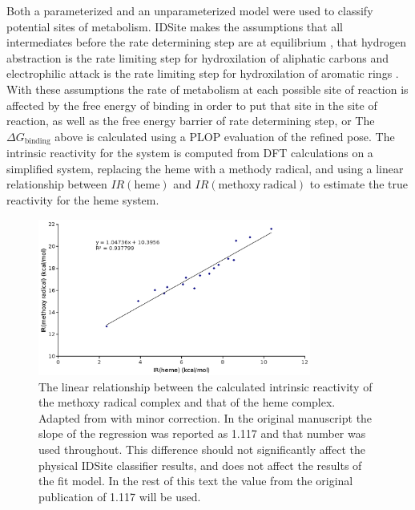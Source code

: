 Both a parameterized and an unparameterized model were used to classify potential sites of metabolism.
IDSite makes the assumptions that all intermediates before the rate determining step are at equilibrium \cite{wang2007stochastic}, that hydrogen abstraction is the rate limiting step for hydroxilation of aliphatic carbons and electrophilic attack is the rate limiting step for hydroxilation of aromatic rings \cite{guengerich2001common,shaik2005theoretical}.
With these assumptions the rate of metabolism at each possible site of reaction is affected by the free energy of binding in order to put that site in the site of reaction, as well as the free energy barrier of rate determining step, or
The ${\Delta}G_{\mathrm{binding}}$ above is calculated using a PLOP evaluation of the refined pose.
The intrinsic reactivity for the system is computed from DFT calculations on a simplified system, replacing the heme with a methody radical, and using a linear relationship between $IR(\mathrm{heme})$ and $IR(\mathrm{methoxy\ radical})$ to estimate the true reactivity for the heme system.
\begin{figure}[h]
\centering
\includegraphics[width=0.8\textwidth]{figures/idsite/intrinsic_corrected.png}
\caption{The linear relationship between the calculated intrinsic reactivity of the methoxy radical complex and that of the heme complex.
Adapted from \protect\cite{li2011idsite} with minor correction.
In the original manuscript the slope of the regression was reported as 1.117 and that number was used throughout.
This difference should not significantly affect the physical IDSite classifier results, and does not affect the results of the fit model.
In the rest of this text the value from the original publication of 1.117 will be used.}
\label{fig:idsite/intrinsic}
\end{figure}

